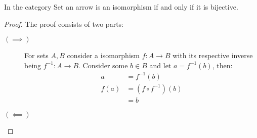 \begin{theorem}
  In the category Set an arrow is an isomorphism if and only if it is
  bijective.

  \begin{proof}
    The proof consists of two parts:
    \begin{description}
      \item[$(\implies)$] For sets $A,B$ consider a isomorphism $f:A\to B$ with
        its respective inverse being $f^{-1}: A\to B$. Consider some $b\in B$
        and let $a = f^{-1}(b)$, then:
        \[
          \begin{aligned}
            a &= f^{-1}(b)\\
            f(a) &= (f\circ f^{-1})(b)\\
            &= b
          \end{aligned}
        \]
      \item[$(\impliedby)$]
    \end{description}
  \end{proof}
\end{theorem}